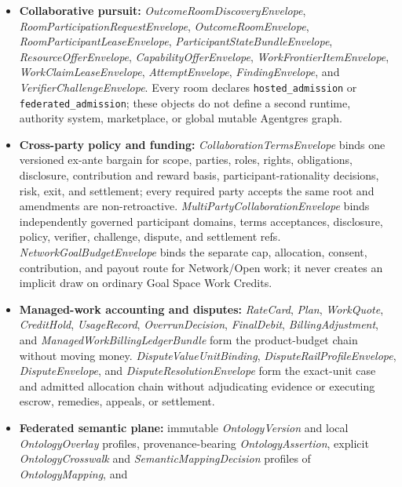 \documentclass[
  11pt,
]{article}
\begin{document}
\begin{itemize}
  moves eligible evidence across one adjacent target-order edge; and
  \emph{ImprovementEvidenceClaimEnvelope} records only the qualified evidence
  established. None is an execution engine or promotion authority.
\item
  \textbf{Collaborative pursuit:} \emph{OutcomeRoomDiscoveryEnvelope},
  \emph{RoomParticipationRequestEnvelope}, \emph{OutcomeRoomEnvelope},
  \emph{RoomParticipantLeaseEnvelope}, \emph{ParticipantStateBundleEnvelope},
  \emph{ResourceOfferEnvelope}, \emph{CapabilityOfferEnvelope},
  \emph{WorkFrontierItemEnvelope}, \emph{WorkClaimLeaseEnvelope},
  \emph{AttemptEnvelope}, \emph{FindingEnvelope}, and
  \emph{VerifierChallengeEnvelope}. Every room declares
  \texttt{hosted\_admission} or \texttt{federated\_admission}; these
  objects do not define a second runtime, authority system, marketplace, or
  global mutable Agentgres graph.
\item
  \textbf{Cross-party policy and funding:}
  \emph{CollaborationTermsEnvelope} binds one versioned ex-ante bargain for
  scope, parties, roles, rights, obligations, disclosure, contribution and
  reward basis, participant-rationality decisions, risk, exit, and settlement;
  every required party accepts the same root and amendments are non-retroactive.
  \emph{MultiPartyCollaborationEnvelope} binds independently governed
  participant domains, terms acceptances, disclosure, policy, verifier,
  challenge, dispute, and settlement refs. \emph{NetworkGoalBudgetEnvelope} binds the separate cap,
  allocation, consent, contribution, and payout route for Network/Open work;
  it never creates an implicit draw on ordinary Goal Space Work Credits.
\item
  \textbf{Managed-work accounting and disputes:}
  \emph{RateCard}, \emph{Plan}, \emph{WorkQuote}, \emph{CreditHold},
  \emph{UsageRecord}, \emph{OverrunDecision}, \emph{FinalDebit},
  \emph{BillingAdjustment}, and
  \emph{ManagedWorkBillingLedgerBundle} form the product-budget chain without
  moving money. \emph{DisputeValueUnitBinding},
  \emph{DisputeRailProfileEnvelope}, \emph{DisputeEnvelope}, and
  \emph{DisputeResolutionEnvelope} form the exact-unit case and admitted
  allocation chain without adjudicating evidence or executing escrow,
  remedies, appeals, or settlement.
\item
  \textbf{Federated semantic plane:} immutable \emph{OntologyVersion} and
  local \emph{OntologyOverlay} profiles, provenance-bearing
  \emph{OntologyAssertion}, explicit \emph{OntologyCrosswalk} and
  \emph{SemanticMappingDecision} profiles of \emph{OntologyMapping}, and

\end{itemize}
\end{document}
